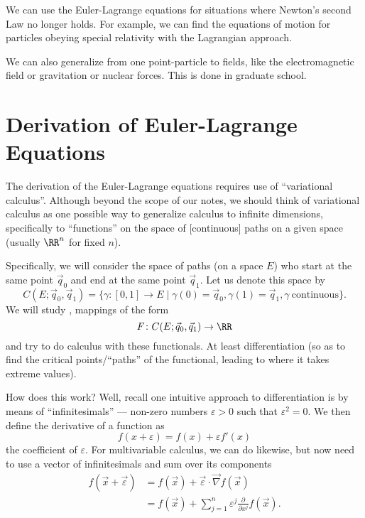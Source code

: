 We can use the Euler-Lagrange equations for situations where Newton's
second Law no longer holds. For example, we can find the equations of
motion for particles obeying special relativity with the Lagrangian
approach.

We can also generalize from one point-particle to fields, like the
electromagnetic field or gravitation or nuclear forces. This is done in
graduate school.

\section{Derivation of Euler-Lagrange Equations}

\M
The derivation of the Euler-Lagrange equations requires use of
``variational calculus''. Although beyond the scope of our notes, we
should think of variational calculus as one possible way to generalize
calculus to infinite dimensions, specifically to ``functions'' on the
space of [continuous] paths on a given space (usually $\RR^{n}$ for
fixed $n$).

Specifically, we will consider the space of paths (on a space $E$) who
start at the same point $\vec{q}_{0}$ and end at the same point
$\vec{q}_{1}$. Let us denote this space by
\begin{equation}
C(E; \vec{q}_{0},\vec{q}_{1}) = \{\gamma\colon[0,1]\to E\mid\gamma(0)=\vec{q}_{0},\gamma(1)=\vec{q}_{1},\gamma~\mbox{continuous}\}.
\end{equation}
We will study , mappings of the form
\begin{equation}
F\colon C(E; \vec{q}_{0},\vec{q}_{1})\to\RR
\end{equation}
and try to do calculus with these functionals. At least differentiation
(so as to find the critical points/``paths'' of the functional, leading
to where it takes extreme values).

How does this work? Well, recall one intuitive approach to
differentiation is by means of ``infinitesimals'' --- non-zero numbers
$\varepsilon>0$ such that $\varepsilon^{2}=0$. We then define the
derivative of a function as
\begin{equation}
f(x + \varepsilon) = f(x) + \varepsilon f'(x) 
\end{equation}
the coefficient of $\varepsilon$. For multivariable calculus, we can do
likewise, but now need to use a vector of infinitesimals and sum over
its components
\begin{equation}
  \begin{split}
f(\vec{x} + \vec{\varepsilon}) &= f(\vec{x}) + \vec{\varepsilon}\cdot\vec{\nabla}f(\vec{x})\\
&= f(\vec{x}) + \sum^{n}_{j=1}\varepsilon^{j}\frac{\partial}{\partial x^{j}}f(\vec{x}).
  \end{split}
\end{equation}

